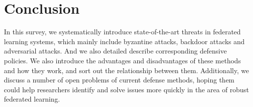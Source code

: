 \documentclass[conference]{IEEEtran}
\begin{document}
\section{Conclusion}
In this survey, we systematically introduce state-of-the-art threats in federated learning systems,
which mainly include byzantine attacks, backdoor attacks and adversarial attacks. 
And we also detailed describe corresponding defensive policies.
We also introduce the advantages and disadvantages of these methods and how they work, and sort out the relationship between them.
Additionally, we discuss a number of open problems of current defense methods,
hoping them could help researchers identify and solve issues more quickly in the area of robust federated learning.



\newpage
\end{document}

